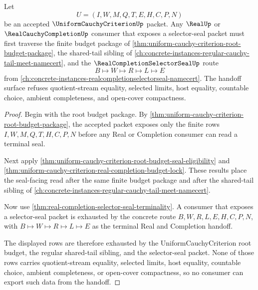 \begin{theorem}
\label{thm:uniform-cauchy-criterion-selector-seal-handoff-lock}
Let
$$
U=(I,W,M,Q,T,E,H,C,P,N)
$$
be an accepted $\UniformCauchyCriterionUp$ packet. Any $\RealUp$ or $\RealCauchyCompletionUp$ consumer that exposes a selector-seal packet must first traverse the finite budget package of \autoref{thm:uniform-cauchy-criterion-root-budget-package}, the shared-tail sibling of \autoref{ch:concrete-instances-regular-cauchy-tail-meet-namecert}, and the $\RealCompletionSelectorSealUp$ route
$$
B \longmapsto W \longmapsto R \longmapsto L \longmapsto E
$$
from \autoref{ch:concrete-instances-realcompletionselectorseal-namecert}. The handoff surface refuses quotient-stream equality, selected limits, host equality, countable choice, ambient completeness, and open-cover compactness.
\end{theorem}
\begin{proof}
Begin with the root budget package. By \autoref{thm:uniform-cauchy-criterion-root-budget-package}, the accepted packet exposes only the finite rows $I,W,M,Q,T,H,C,P,N$ before any Real or Completion consumer can read a terminal seal.

Next apply \autoref{thm:uniform-cauchy-criterion-root-budget-seal-eligibility} and \autoref{thm:uniform-cauchy-criterion-real-completion-budget-lock}. These results place the seal-facing read after the same finite budget package and after the shared-tail sibling of \autoref{ch:concrete-instances-regular-cauchy-tail-meet-namecert}.

Now use \autoref{thm:real-completion-selector-seal-terminality}. A consumer that exposes a selector-seal packet is exhausted by the concrete route $B,W,R,L,E,H,C,P,N$, with $B\mapsto W\mapsto R\mapsto L\mapsto E$ as the terminal Real and Completion handoff.

The displayed rows are therefore exhausted by the UniformCauchyCriterion root budget, the regular shared-tail sibling, and the selector-seal packet. None of those rows carries quotient-stream equality, selected limits, host equality, countable choice, ambient completeness, or open-cover compactness, so no consumer can export such data from the handoff.
\end{proof}

